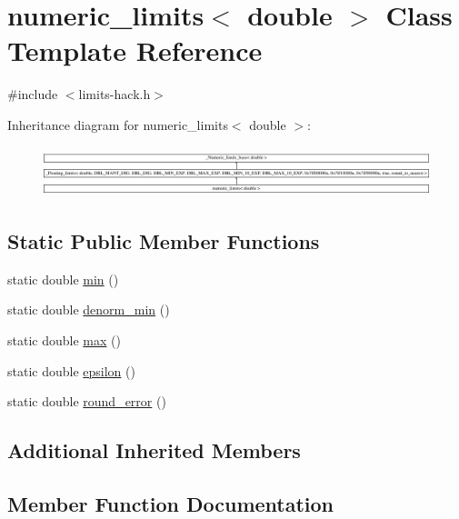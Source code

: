 \hypertarget{classnumeric__limits_3_01double_01_4}{}\section{numeric\+\_\+limits$<$ double $>$ Class Template Reference}
\label{classnumeric__limits_3_01double_01_4}


{\ttfamily \#include $<$limits-\/hack.\+h$>$}

Inheritance diagram for numeric\+\_\+limits$<$ double $>$\+:\begin{figure}[H]
\begin{center}
\leavevmode
\includegraphics[height=1.469816cm]{classnumeric__limits_3_01double_01_4}
\end{center}
\end{figure}
\subsection*{Static Public Member Functions}
\begin{DoxyCompactItemize}
\item 
static double \hyperlink{classnumeric__limits_3_01double_01_4_a1ce6b951bcfa2386836b10bd3725a791}{min} ()
\item 
static double \hyperlink{classnumeric__limits_3_01double_01_4_ab1e77d86896c2e4be1f21de9d2c470e0}{denorm\+\_\+min} ()
\item 
static double \hyperlink{classnumeric__limits_3_01double_01_4_a1261601797d0837c35195bdc10be8ebf}{max} ()
\item 
static double \hyperlink{classnumeric__limits_3_01double_01_4_aa9aed0d3aba57030c2f0807eac6d2a89}{epsilon} ()
\item 
static double \hyperlink{classnumeric__limits_3_01double_01_4_a7f471991005be19ddfa338d81ea7e046}{round\+\_\+error} ()
\end{DoxyCompactItemize}
\subsection*{Additional Inherited Members}


\subsection{Member Function Documentation}
\hypertarget{classnumeric__limits_3_01double_01_4_ab1e77d86896c2e4be1f21de9d2c470e0}{}
